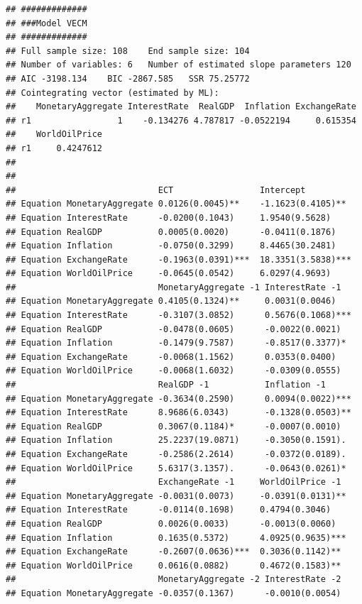 \documentclass[11pt,preprint, authoryear]{elsarticle}
\numberwithin{equation}{section}
\numberwithin{figure}{section}
\numberwithin{table}{section}
\begin{document}
\begin{verbatim}
## #############
## ###Model VECM 
## #############
## Full sample size: 108    End sample size: 104
## Number of variables: 6   Number of estimated slope parameters 120
## AIC -3198.134    BIC -2867.585   SSR 75.25772
## Cointegrating vector (estimated by ML):
##    MonetaryAggregate InterestRate  RealGDP  Inflation ExchangeRate
## r1                 1    -0.134276 4.787817 -0.0522194     0.615354
##    WorldOilPrice
## r1     0.4247612
## 
## 
##                            ECT                 Intercept          
## Equation MonetaryAggregate 0.0126(0.0045)**    -1.1623(0.4105)**  
## Equation InterestRate      -0.0200(0.1043)     1.9540(9.5628)     
## Equation RealGDP           0.0005(0.0020)      -0.0411(0.1876)    
## Equation Inflation         -0.0750(0.3299)     8.4465(30.2481)    
## Equation ExchangeRate      -0.1963(0.0391)***  18.3351(3.5838)*** 
## Equation WorldOilPrice     -0.0645(0.0542)     6.0297(4.9693)     
##                            MonetaryAggregate -1 InterestRate -1    
## Equation MonetaryAggregate 0.4105(0.1324)**     0.0031(0.0046)     
## Equation InterestRate      -0.3107(3.0852)      0.5676(0.1068)***  
## Equation RealGDP           -0.0478(0.0605)      -0.0022(0.0021)    
## Equation Inflation         -0.1479(9.7587)      -0.8517(0.3377)*   
## Equation ExchangeRate      -0.0068(1.1562)      0.0353(0.0400)     
## Equation WorldOilPrice     -0.0068(1.6032)      -0.0309(0.0555)    
##                            RealGDP -1           Inflation -1       
## Equation MonetaryAggregate -0.3634(0.2590)      0.0094(0.0022)***  
## Equation InterestRate      8.9686(6.0343)       -0.1328(0.0503)**  
## Equation RealGDP           0.3067(0.1184)*      -0.0007(0.0010)    
## Equation Inflation         25.2237(19.0871)     -0.3050(0.1591).   
## Equation ExchangeRate      -0.2586(2.2614)      -0.0372(0.0189).   
## Equation WorldOilPrice     5.6317(3.1357).      -0.0643(0.0261)*   
##                            ExchangeRate -1     WorldOilPrice -1   
## Equation MonetaryAggregate -0.0031(0.0073)     -0.0391(0.0131)**  
## Equation InterestRate      -0.0114(0.1698)     0.4794(0.3046)     
## Equation RealGDP           0.0026(0.0033)      -0.0013(0.0060)    
## Equation Inflation         0.1635(0.5372)      4.0925(0.9635)***  
## Equation ExchangeRate      -0.2607(0.0636)***  0.3036(0.1142)**   
## Equation WorldOilPrice     0.0616(0.0882)      0.4672(0.1583)**   
##                            MonetaryAggregate -2 InterestRate -2    
## Equation MonetaryAggregate -0.0357(0.1367)      -0.0010(0.0054)    

\end{verbatim}
\end{document}
